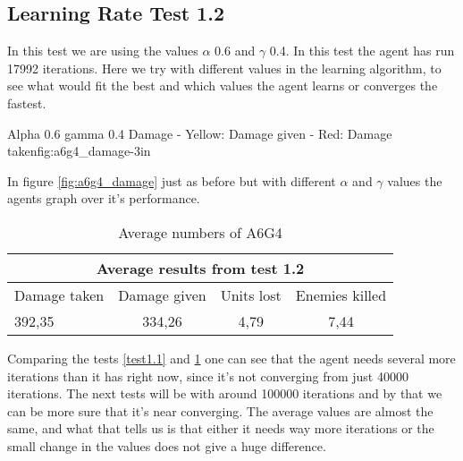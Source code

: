 \subsection*{Learning Rate Test 1.2}
In this test we are using the values $\alpha$ 0.6 and $\gamma$ 0.4. In this test the agent has run 17992 iterations. Here we try with different values in the learning algorithm, to see what would fit the best and which values the agent learns or converges the fastest.


			{Alpha 0.6 gamma 0.4 Damage - Yellow: Damage given - Red: Damage taken}{fig:a6g4_damage}{-3in}

In figure \ref{fig:a6g4_damage} just as before but with different $\alpha$ and $\gamma$ values the agents graph over it's performance.






\begin{centering}
\begin{table}
 \begin{tabular}{|l|c|c|c|}
	\multicolumn{4}{c}{Average results from test 1.2} \\
	\hline
		Damage taken & Damage given & Units lost & Enemies killed\\
	\hline
		392,35 & 334,26 & 4,79 & 7,44 \\
	\hline
\end{tabular}
\caption{Average numbers of A6G4}
\label{test1.2}
\end{table}
\end{centering}

Comparing the tests \ref{test1.1} and \ref{test1.2} one can see that the agent needs several more iterations than it has right now, since it's not converging from just 40000 iterations. The next tests will be with around 100000 iterations and by that we can be more sure that it's near converging. The average values are almost the same, and what that tells us is that either it needs way more iterations or the small change in the values does not give a huge difference.